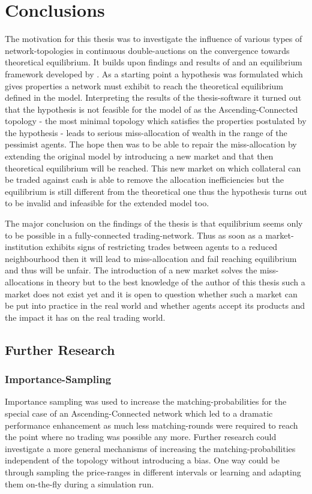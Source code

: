 \documentclass[Bachelorarbeit.tex]{subfiles}
\begin{document}
\chapter{Conclusions}
\label{ch:conclusions}

The motivation for this thesis was to investigate the influence of various types of network-topologies in continuous double-auctions on the convergence towards theoretical equilibrium. It builds upon findings and results of \cite{Breuer2015} and an equilibrium framework developed by \cite{Geanakoplos2009}. As a starting point a hypothesis was formulated which gives properties a network must exhibit to reach the theoretical equilibrium defined in the model. Interpreting the results of the thesis-software it turned out that the hypothesis is not feasible for the model of \cite{Breuer2015} as the Ascending-Connected topology - the most minimal topology which satisfies the properties postulated by the hypothesis - leads to serious miss-allocation of wealth in the range of the pessimist agents. The hope then was to be able to repair the miss-allocation by extending the original model by introducing a new market and that then theoretical equilibrium will be reached. This new market on which collateral can be traded against cash is able to remove the allocation inefficiencies but the equilibrium is still different from the theoretical one thus the hypothesis turns out to be invalid and infeasible for the extended model too.

\bigskip

The major conclusion on the findings of the thesis is that equilibrium seems only to be possible in a fully-connected trading-network. Thus as soon as a market-institution exhibits signs of restricting trades between agents to a reduced neighbourhood then it will lead to miss-allocation and fail reaching equilibrium and thus will be unfair. The introduction of a new market solves the miss-allocations in theory but to the best knowledge of the author of this thesis such a market does not exist yet and it is open to question whether such a market can be put into practice in the real world and whether agents accept its products and the impact it has on the real trading world.

\section*{Further Research}

\subsection*{Importance-Sampling}
Importance sampling was used to increase the matching-probabilities for the special case of an Ascending-Connected network which led to a dramatic performance enhancement as much less matching-rounds were required to reach the point where no trading was possible any more. Further research could investigate a more general mechanisms of increasing the matching-probabilities independent of the topology without introducing a bias. One way could be through sampling the price-ranges in different intervals or learning and adapting them on-the-fly during a simulation run.
\end{document}
